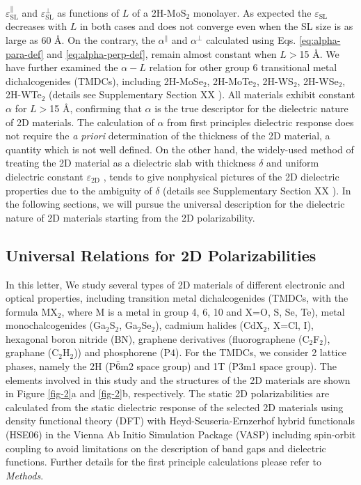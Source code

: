 \documentclass[journal=ancac3,manuscript=article,email=true,hyperref=true,keywords=false]{achemso}
\begin{document}
$\varepsilon_{\mathrm{SL}}^{\parallel}$ and
$\varepsilon_{\mathrm{SL}}^{\perp}$ as functions of $L$ of a
2H-MoS$_{2}$ monolayer. As expected the $\varepsilon_{\mathrm{SL}}$
decreases with $L$ in both cases and does not converge even when the
SL size is as large as 60 \AA{}. On the contrary, the
$\alpha^{\parallel}$ and $\alpha^{\perp}$ calculated using
Eqs. \ref{eq:alpha-para-def} and \ref{eq:alpha-perp-def}, remain
almost constant when $L>$15 \AA{}. We have further examined the
$\alpha-L$ relation for other group 6 transitional metal
dichalcogenides (TMDCs), including 2H-MoSe$_{2}$, 2H-MoTe$_{2}$,
2H-WS$_{2}$, 2H-WSe$_{2}$, 2H-WTe$_{2}$ (details see Supplementary
Section XX ). All materials exhibit constant $\alpha$ for
$L>$15 \AA{}, confirming that $\alpha$ is the true descriptor for the
dielectric nature of 2D materials. The calculation of $\alpha$ from
first principles dielectric response does not require the \textit{a
  priori} determination of the thickness of the 2D material, a
quantity which is not well defined. On the other hand, the widely-used
method of treating the 2D material as a dielectric slab with thickness
$\delta$ and uniform dielectric constant $\varepsilon_{\mathrm{2D}}$
\cite{Sharma_1985,Cudazzo_2011_screening_2D,Trolle_2017_eps_subst},
tends to give nonphysical pictures of the 2D dielectric properties due
to the ambiguity of $\delta$ (details see Supplementary Section XX
). In the following sections, we will pursue the universal
description for the dielectric nature of 2D materials starting from
the 2D polarizability.

\subsection{Universal Relations for 2D Polarizabilities}
\label{sec:first-principles}

In this letter, We study several types of 2D materials of different
electronic and optical properties, including transition metal
dichalcogenides (TMDCs, with the formula MX\(_{\text{2}}\), where M is
a metal in group 4, 6, 10 and X=O, S, Se, Te), metal monochalcogenides
(Ga$_{2}$S$_{2}$, Ga$_{2}$Se$_{2}$), cadmium halides (CdX$_2$, X=Cl,
I), hexagonal boron nitride (BN), graphene derivatives (fluorographene
(C$_{2}$F$_{2}$), graphane (C$_{2}$H$_{2}$)) and phosphorene (P$4$).
For the TMDCs, we consider 2 lattice phases, namely the 2H
(P\(\bar{6}\)m2 space group) and 1T (P3m1 space group).  The elements
involved in this study and the structures of the 2D materials are
shown in Figure \ref{fig-2}a and \ref{fig-2}b, respectively. The
static 2D polarizabilities are calculated from the static dielectric
response of the selected 2D materials using density functional theory
(DFT) with Heyd-Scuseria-Ernzerhof hybrid functionals (HSE06) in the
Vienna Ab Initio Simulation Package (VASP) including spin-orbit
coupling to avoid limitations on the description of band gaps and
dielectric functions. Further details for the first principle
calculations please refer to \textit{Methods}.
\end{document}
